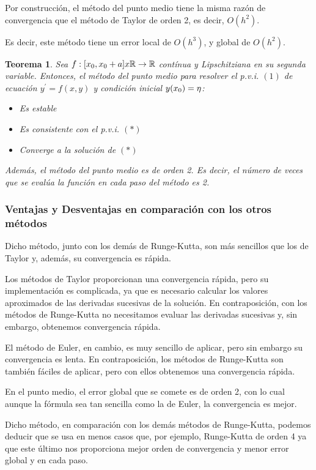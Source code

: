 \documentclass[paper=a4, fontsize=11pt]{scrartcl} %
\newtheorem{teo}{Teorema}[section]
\numberwithin{equation}{section}
\begin{document}
	Por construcción, el método del punto medio tiene la misma razón de convergencia que el método de Taylor de orden 2, es decir, $O(h^2)$.
	
	Es decir, este método tiene un error local de $O(h^3)$, y global de $O(h^2)$.
	
	\begin{teo}
		Sea $f: [x\textsubscript{0}, x\textsubscript{0}+a] x \mathbb{R} \rightarrow \mathbb{R}$ contínua y \textit{Lipschitziana} en su segunda variable. Entonces, el método del punto medio para resolver el p.v.i. $(1)$ de ecuación $y^\prime = f(x,y)$ y condición inicial $y(x\textsubscript{0}) = \eta$:
			\begin{itemize}
				\item Es estable
				\item Es consistente con el p.v.i. $(*)$
				\item Converge a la solución de $(*)$
			\end{itemize}
			Además, el método del punto medio es de orden 2. Es decir, el número de veces que se evalúa la función en cada paso del método es 2.
		\end{teo}
	
	
	
	\subsubsection{Ventajas y Desventajas en comparación con los otros métodos}
	Dicho método, junto con los demás de Runge-Kutta, son más sencillos que los de Taylor y, además, su convergencia es rápida.
	
	Los métodos de Taylor proporcionan una convergencia rápida, pero su implementación es complicada, ya que es necesario calcular los valores aproximados de las derivadas sucesivas de la solución. En contraposición, con los métodos de Runge-Kutta no necesitamos evaluar las derivadas sucesivas y, sin embargo, obtenemos convergencia rápida.
	
	El método de Euler, en cambio, es muy sencillo de aplicar, pero sin embargo su convergencia es lenta. En contraposición, los métodos de Runge-Kutta son también fáciles de aplicar, pero con ellos obtenemos una convergencia rápida.
	
	En el punto medio, el error global que se comete es de orden 2, con lo cual aunque la fórmula sea tan sencilla como la de Euler, la convergencia es mejor.
	
	Dicho método, en comparación con los demás métodos de Runge-Kutta, podemos deducir que se usa en menos casos que, por ejemplo, Runge-Kutta de orden 4 ya que este último nos proporciona mejor orden de convergencia y menor error global y en cada paso.
	
\end{document}

